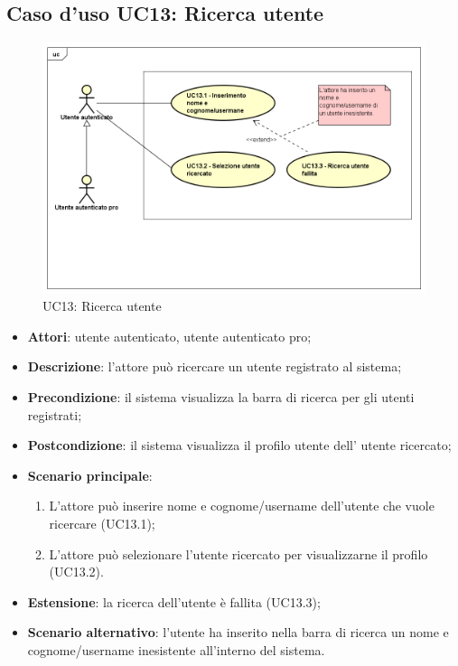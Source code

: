 \newpage
\subsection{Caso d'uso UC13: Ricerca utente}
\label{UC11}
\begin{figure}[h]
	\centering
	\includegraphics[scale=0.5]{UML/UC13.png}
	\caption{UC13: Ricerca utente}
\end{figure}
\FloatBarrier
\begin{itemize}
	\item \textbf{Attori}: utente autenticato, utente autenticato pro;
	\item \textbf{Descrizione}: l'attore può ricercare un utente registrato al sistema;
	\item \textbf{Precondizione}: il sistema visualizza la barra di ricerca per gli utenti registrati;
	\item \textbf{Postcondizione}: il sistema visualizza il profilo utente dell' utente ricercato;
	\item \textbf{Scenario principale}:
	\begin{enumerate}
		\item L'attore può inserire nome e cognome/username dell'utente che vuole ricercare (UC13.1);
		\item L'attore può selezionare l'utente ricercato per visualizzarne il profilo (UC13.2).
	\end{enumerate} 
	\item \textbf{Estensione}: la ricerca dell'utente è fallita (UC13.3);
	\item \textbf{Scenario alternativo}: l'utente ha inserito nella barra di ricerca un nome e cognome/username inesistente all'interno del sistema. 
\end{itemize}

